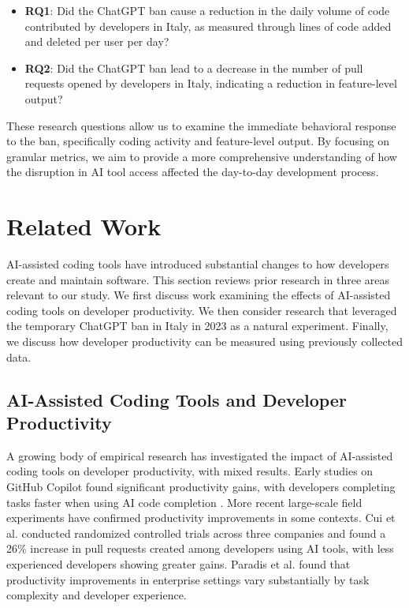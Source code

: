 \begin{itemize}
  \item \textbf{RQ1}: Did the ChatGPT ban cause a reduction in the daily volume of code contributed by developers in Italy, as measured through lines of code added and deleted per user per day?
  \item \textbf{RQ2}: Did the ChatGPT ban lead to a decrease in the number of pull requests opened by developers in Italy, indicating a reduction in feature-level output?
\end{itemize}

These research questions allow us to examine the immediate behavioral response to the ban, specifically coding activity and feature-level output. By focusing on granular metrics, we aim to provide a more comprehensive understanding of how the disruption in AI tool access affected the day-to-day development process.

\section{Related Work}

AI-assisted coding tools have introduced substantial changes to how developers create and maintain software. This section reviews prior research in three areas relevant to our study. We first discuss work examining the effects of AI-assisted coding tools on developer productivity. We then consider research that leveraged the temporary ChatGPT ban in Italy in 2023 as a natural experiment. Finally, we discuss how developer productivity can be measured using previously collected data.

\subsection{AI-Assisted Coding Tools and Developer Productivity}

A growing body of empirical research has investigated the impact of AI-assisted coding tools on developer productivity, with mixed results. Early studies on GitHub Copilot found significant productivity gains, with developers completing tasks faster when using AI code completion \cite[p.~5]{peng2023impactaideveloperproductivity}. More recent large-scale field experiments have confirmed productivity improvements in some contexts. Cui et al. \cite[pp.~12, 19]{cui2025the} conducted randomized controlled trials across three companies and found a 26\% increase in pull requests created among developers using AI tools, with less experienced developers showing greater gains. Paradis et al. \cite[p.~2]{paradis2024doesaiimpactdevelopment} found that productivity improvements in enterprise settings vary substantially by task complexity and developer experience.

